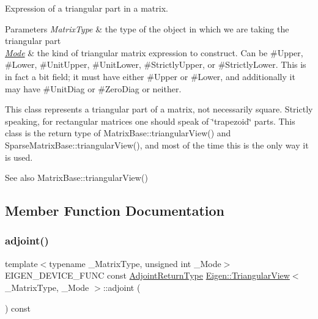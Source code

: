 Expression of a triangular part in a matrix. 


\begin{DoxyParams}{Parameters}
{\em Matrix\+Type} & the type of the object in which we are taking the triangular part \\
\hline
{\em \mbox{\hyperlink{struct_mode}{Mode}}} & the kind of triangular matrix expression to construct. Can be \#\+Upper, \#\+Lower, \#\+Unit\+Upper, \#\+Unit\+Lower, \#\+Strictly\+Upper, or \#\+Strictly\+Lower. This is in fact a bit field; it must have either \#\+Upper or \#\+Lower, and additionally it may have \#\+Unit\+Diag or \#\+Zero\+Diag or neither.\\
\hline
\end{DoxyParams}
This class represents a triangular part of a matrix, not necessarily square. Strictly speaking, for rectangular matrices one should speak of \char`\"{}trapezoid\char`\"{} parts. This class is the return type of Matrix\+Base\+::triangular\+View() and Sparse\+Matrix\+Base\+::triangular\+View(), and most of the time this is the only way it is used.

\begin{DoxySeeAlso}{See also}
Matrix\+Base\+::triangular\+View() 
\end{DoxySeeAlso}


\subsection{Member Function Documentation}
\mbox{\label{class_eigen_1_1_triangular_view_ab36cd4a400b5a9944b87780ebd3bec43}} 
\subsubsection{\texorpdfstring{adjoint()}{adjoint()}}
{\footnotesize\ttfamily template$<$typename \+\_\+\+Matrix\+Type, unsigned int \+\_\+\+Mode$>$ \\
E\+I\+G\+E\+N\+\_\+\+D\+E\+V\+I\+C\+E\+\_\+\+F\+U\+NC const \mbox{\hyperlink{class_eigen_1_1_triangular_view}{Adjoint\+Return\+Type}} \mbox{\hyperlink{class_eigen_1_1_triangular_view}{Eigen\+::\+Triangular\+View}}$<$ \+\_\+\+Matrix\+Type, \+\_\+\+Mode $>$\+::adjoint (\begin{DoxyParamCaption}{ }\end{DoxyParamCaption}) const\hspace{0.3cm}{\ttfamily [inline]}}

